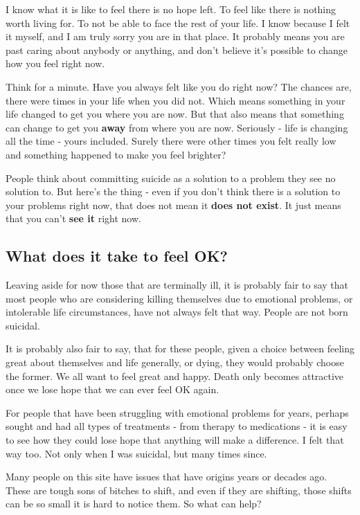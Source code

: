 \documentclass[12pt]{article}
\begin{document}
I know what it is like to feel there is no hope left. To feel like there is nothing worth living for. To not be able to face the rest of your life. I know because I felt it myself, and I am truly sorry you are in that place. It probably means you are past caring about anybody or anything, and don't believe it's possible to change how you feel right now.

Think for a minute. Have you always felt like you do right now? The chances are, there were times in your life when you did not. Which means something in your life changed to get you where you are now. But that also means that something can change to get you \textbf{away} from where you are now. Seriously - life is changing all the time - yours included. Surely there were other times you felt really low and something happened to make you feel brighter?

People think about committing suicide as a solution to a problem they see no solution to. But here's the thing - even if you don't think there is a solution to your problems right now, that does not mean it \textbf{does not exist}. It just means that you can't \textbf{see it} right now.

\subsection{What does it take to feel OK?}

Leaving aside for now those that are terminally ill, it is probably fair to say that most people who are considering killing themselves due to emotional problems, or intolerable life circumstances, have not always felt that way. People are not born suicidal.

It is probably also fair to say, that for these people, given a choice between feeling great about themselves and life generally, or dying, they would probably choose the former. We all want to feel great and happy. Death only becomes attractive once we lose hope that we can ever feel OK again.

For people that have been struggling with emotional problems for years, perhaps sought and had all types of treatments - from therapy to medications - it is easy to see how they could lose hope that anything will make a difference. I felt that way too. Not only when I was suicidal, but many times since.

Many people on this site have issues that have origins years or decades ago. These are tough sons of bitches to shift, and even if they are shifting, those shifts can be so small it is hard to notice them. So what can help?
\end{document}
